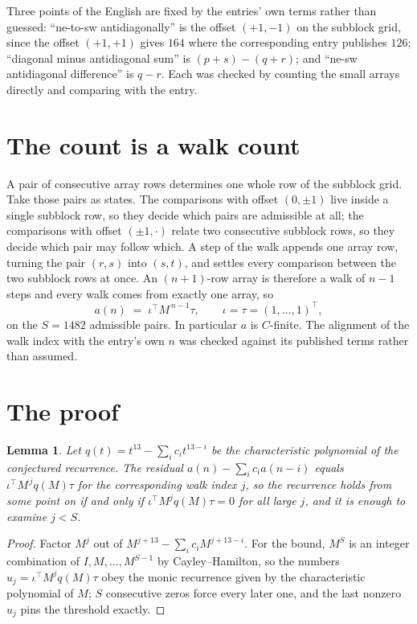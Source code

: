 \documentclass[11pt,a4paper]{article}
\theoremstyle{plain}
\newtheorem{lemma}[theorem]{Lemma}
\theoremstyle{definition}
\begin{document}
Three points of the English are fixed by the entries' own terms rather than guessed:
``ne-to-sw antidiagonally'' is the offset $(+1,-1)$ on the subblock grid, since the offset
$(+1,+1)$ gives $164$ where the corresponding entry publishes $126$; ``diagonal minus
antidiagonal sum'' is $(p+s)-(q+r)$; and ``ne-sw antidiagonal difference'' is $q-r$. Each was
checked by counting the small arrays directly and comparing with the entry.

\section{The count is a walk count}

A pair of consecutive array rows determines one whole row of the subblock grid. Take those
pairs as states. The comparisons with offset $(0,\pm1)$ live inside a single subblock row, so
they decide which pairs are admissible at all; the comparisons with offset $(\pm1,\cdot)$
relate two consecutive subblock rows, so they decide which pair may follow which. A step of the
walk appends one array row, turning the pair $(r,s)$ into $(s,t)$, and settles every comparison
between the two subblock rows at once. An $(n+1)$-row array is therefore a walk of $n-1$ steps
and every walk comes from exactly one array, so
\[
a(n)\;=\;\iota^{\!\top}M^{\,n-1}\tau,\qquad \iota=\tau=(1,\dots,1)^{\!\top},
\]
on the $S=1482$ admissible pairs. In particular $a$ is $C$-finite. The alignment of the walk
index with the entry's own $n$ was checked against its published terms rather than assumed.

\section{The proof}

\begin{lemma}\label{lem:crit}
Let $q(t)=t^{13}-\sum_i c_it^{13-i}$ be the characteristic polynomial of the
conjectured recurrence. The residual $a(n)-\sum_ic_ia(n-i)$ equals
$\iota^{\!\top}M^{\,j}q(M)\tau$ for the corresponding walk index $j$, so the recurrence
holds from some point on if and only if $\iota^{\!\top}M^{j}q(M)\tau=0$ for all large $j$,
and it is enough to examine $j<S$.
\end{lemma}

\begin{proof}
Factor $M^{j}$ out of $M^{j+13}-\sum_ic_iM^{j+13-i}$. For the bound, $M^{S}$
is an integer combination of $I,M,\dots,M^{S-1}$ by Cayley--Hamilton, so the numbers
$u_j=\iota^{\!\top}M^{j}q(M)\tau$ obey the monic recurrence given by the characteristic
polynomial of $M$; $S$ consecutive zeros force every later one, and the last nonzero $u_j$
pins the threshold exactly.
\end{proof}
\end{document}
